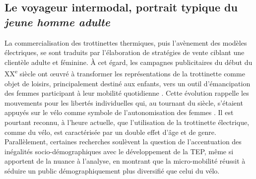 \begin{refsegment}
\subsection{Le voyageur intermodal, portrait typique du \textsl{jeune homme adulte}
    \label{chap4:demographie}
    }

La commercialisation des trottinettes thermiques, puis l'avènement des modèles électriques, se sont traduits par l'élaboration de stratégies de vente ciblant une clientèle adulte et féminine. À cet égard, les campagnes publicitaires du début du XX\textsuperscript{e} siècle ont œuvré à transformer les représentations de la trottinette comme objet de loisirs, principalement destiné aux enfants, vers un outil d’émancipation des femmes participant à leur mobilité quotidienne \textcolor{blue}{\autocite{hemmings_look_2011}}. Cette évolution rappelle les mouvements pour les libertés individuelles qui, au tournant du siècle, s'étaient appuyés sur le vélo comme symbole de l'autonomisation des femmes \textcolor{blue}{\autocite[187]{heran_retour_2015}}. Il est pourtant reconnu, à l’heure actuelle, que l'utilisation de la trottinette électrique, comme du vélo, est caractérisée par un double effet d’âge et de genre. Parallèlement, certaines recherches soulèvent la question de l'accentuation des inégalités socio-démographiques avec le développement de la \acrshort{TEP}, même si \textcolor{blue}{\textcite[12]{curl_same_2020}} apportent de la nuance à l'analyse, en montrant que la micro-mobilité réussit à séduire un public démographiquement plus diversifié que celui du vélo.%


\end{refsegment}
